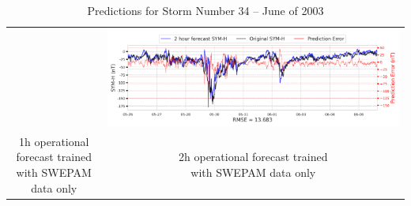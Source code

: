 \documentclass[draft,sw]{agutexSI2019}
\begin{document}
\begin{table}
\begin{tabular}{cc}
&
\includegraphics[width=0.49\linewidth]{paper_plots_shade/2h_swepam_rt/2h_swepam_rt_storm_34.png}
\\
\shortstack{1h operational forecast trained\\ with SWEPAM data only} & \shortstack{2h operational forecast trained\\ with SWEPAM data only}
\vspace*{12pt}
\\
\end{tabular}
\caption{Predictions for Storm Number 34 -- June of 2003}
\label{storm-34}
\end{table}
\end{document}
